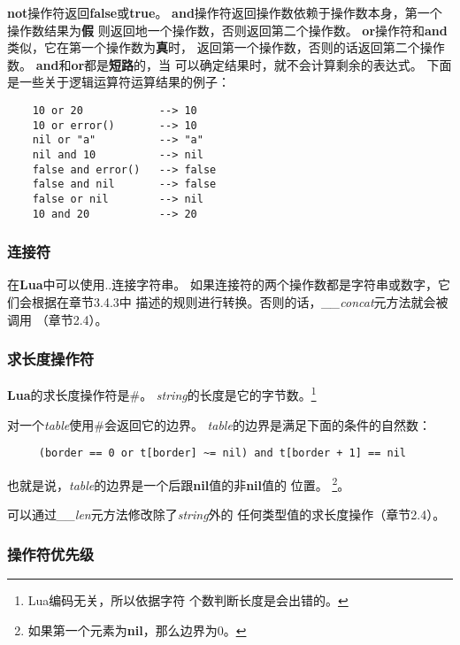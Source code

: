 \documentclass{ctexart}
\begin{document}
\textbf{not}操作符返回\textbf{false}或\textbf{true}。
\textbf{and}操作符返回操作数依赖于操作数本身，第一个操作数结果为\textbf{假}
则返回地一个操作数，否则返回第二个操作数。
\textbf{or}操作符和\textbf{and}类似，它在第一个操作数为\textbf{真}时，
返回第一个操作数，否则的话返回第二个操作数。
\textbf{and}和\textbf{or}都是\textbf{短路}的，当
可以确定结果时，就不会计算剩余的表达式。
下面是一些关于逻辑运算符运算结果的例子：

\lstset{language=C}
\begin{lstlisting}
	10 or 20            --> 10
	10 or error()       --> 10
	nil or "a"          --> "a"
	nil and 10          --> nil
	false and error()   --> false
	false and nil       --> false
	false or nil        --> nil
	10 and 20           --> 20
\end{lstlisting}

\subsubsection{连接符}

在\textbf{Lua}中可以使用..连接字符串。
如果连接符的两个操作数都是字符串或数字，它们会根据在章节3.4.3中
描述的规则进行转换。否则的话，\emph{\_\_concat}元方法就会被调用
（章节2.4）。

\subsubsection{求长度操作符}

\textbf{Lua}的求长度操作符是\#。
\emph{string}的长度是它的字节数。\footnote{Lua编码无关，所以依据字符
个数判断长度是会出错的。}

对一个\emph{table}使用\#会返回它的边界。
\emph{table}的边界是满足下面的条件的自然数：

\lstset{language=C}
\begin{lstlisting}
	 (border == 0 or t[border] ~= nil) and t[border + 1] == nil
\end{lstlisting}

也就是说，\emph{table}的边界是一个后跟\textbf{nil}值的非\textbf{nil}值的
位置。
\footnote{如果第一个元素为\textbf{nil}，那么边界为0。}。

可以通过\emph{\_\_len}元方法修改除了\emph{string}外的
任何类型值的求长度操作（章节2.4）。

\subsubsection{操作符优先级}
\end{document}
